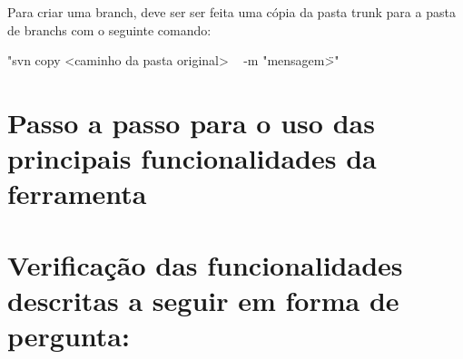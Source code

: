 Para criar uma branch, deve ser ser feita uma cópia da pasta trunk para a pasta de branchs com o seguinte comando:

"svn copy <caminho da pasta original> \ <caminho da pasta de destino, essa pasta deve possuir o nome da branch> -m "mensagem\">"


% 
% 
% 
\section{Passo a passo para o uso das principais funcionalidades da ferramenta}

\section{Verificação das funcionalidades descritas a seguir em forma de pergunta:}

